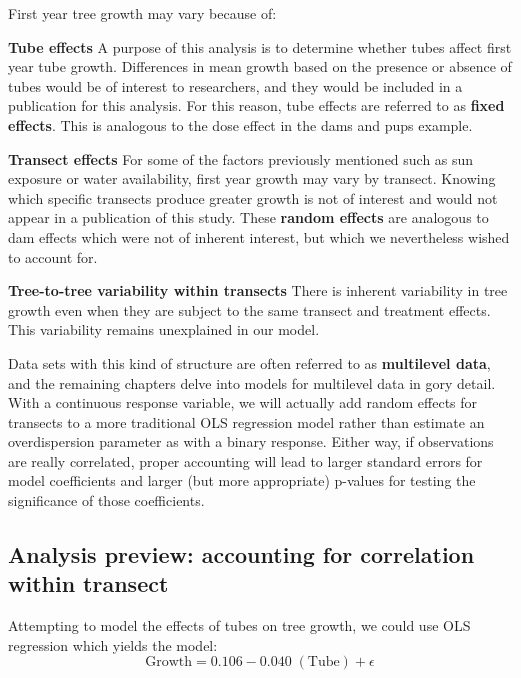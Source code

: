 \documentclass[
]{krantz}
\begin{document}
First year tree growth may vary because of:

\textbf{Tube effects} A purpose of this analysis is to determine whether tubes affect first year tube growth. Differences in mean growth based on the presence or absence of tubes would be of interest to researchers, and they would be included in a publication for this analysis. For this reason, tube effects are referred to as \textbf{fixed effects}. This is analogous to the dose effect in the dams and pups example.

\textbf{Transect effects} For some of the factors previously mentioned such as sun exposure or water availability, first year growth may vary by transect. Knowing which specific transects produce greater growth is not of interest and would not appear in a publication of this study. These \textbf{random effects} are analogous to dam effects which were not of inherent interest, but which we nevertheless wished to account for.

\textbf{Tree-to-tree variability within transects} There is inherent variability in tree growth even when they are subject to the same transect and treatment effects. This variability remains unexplained in our model.

Data sets with this kind of structure are often referred to as \textbf{multilevel data}, and the remaining chapters delve into models for multilevel data in gory detail. With a continuous response variable, we will actually add random effects for transects to a more traditional OLS regression model rather than estimate an overdispersion parameter as with a binary response. Either way, if observations are really correlated, proper accounting will lead to larger standard errors for model coefficients and larger (but more appropriate) p-values for testing the significance of those coefficients.

\hypertarget{analysis-preview-accounting-for-correlation-within-transect}{%
\subsection{Analysis preview: accounting for correlation within transect}\label{analysis-preview-accounting-for-correlation-within-transect}}

Attempting to model the effects of tubes on tree growth, we could use OLS regression which yields the model:
\begin{equation}
  \textrm{Growth} = 0.106 - 0.040\; (\textrm{Tube}) + \epsilon
\end{equation}
\end{document}
